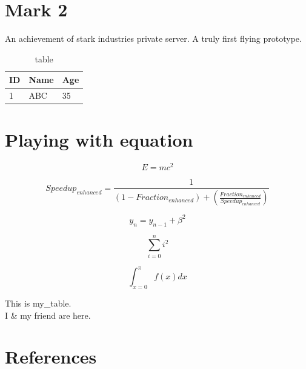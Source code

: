 \documentclass[16pt]{article}
\begin{document}
\section{Mark 2}
\label{mk2}
	An achievement of stark industries private server. A truly first flying prototype.
	\begin{table}[h]
		\begin{center}
			\begin{tabular}{ |l|l|l| }
				\hline
				\textbf{ID}		&	Name & Age \\
				\hline
				1 & ABC & 35 \\
				\hline
			\end{tabular}
			\caption{table}
			\label{label1}
		\end{center}
	\end{table}

\section{Playing with equation}
	\begin{equation}
		E = mc^2
	\end{equation}
	
	\begin{equation}
		Speedup_{enhanced} = \frac{1}{(1-Fraction_{enhanced}) + (\frac{Fraction_{enhanced}}{Speedup_{enhanced}})}
	\end{equation}
	
	\begin{equation}
	y_n = y_{n-1} + \beta^2
	\end{equation}

	\begin{equation}
	\sum_{i=0}^n i^2
	\end{equation}

	\begin{equation}
	\int_{x=0}^{\pi} f(x) dx
	\end{equation}

		This is my\_table.
		\\ I \& my friend are here.\cite{7894533}

\section{References}
	
	
\end{document}
